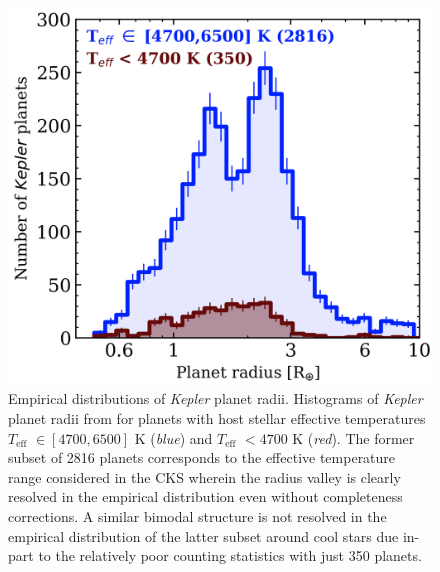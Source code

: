 \documentclass[twocolumn]{emulateapj}
\newcommand{\kepler}[1]{\emph{Kepler}#1}
\newcommand{\teff}[1]{$T_{\text{eff}}$#1}
\begin{document}

\begin{figure}
  \centering
  \includegraphics[width=0.98\hsize]{figures/Bergerplanethist.png}
  \caption{Empirical distributions of \kepler{} planet radii. Histograms of \kepler{} planet radii
    from \cite{berger18} for planets with host stellar effective temperatures \teff{} $\in [4700,6500]$ K
    (\emph{blue}) and \teff{} $<4700$ K (\emph{red}). The former subset of 2816 planets corresponds to the
    effective temperature range considered in the CKS \citep{fulton17} wherein the radius valley is clearly
    resolved in the empirical distribution even without completeness corrections. A similar bimodal
    structure is not resolved in the empirical distribution of the latter subset around cool stars
    due in-part to the relatively poor counting statistics with just 350 planets.}
  \label{fig:berger}
\end{figure}
\end{document}
